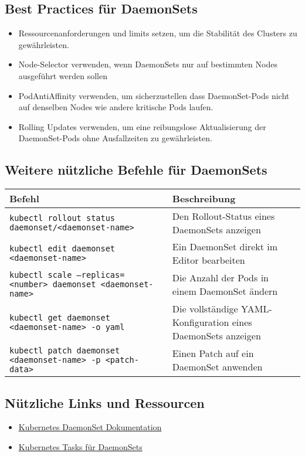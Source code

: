 \subsection{Best Practices für DaemonSets}
\begin{itemize}
    \item Ressourcenanforderungen und limits setzen, um die Stabilität des Clusters zu gewährleisten.
    \item Node-Selector verwenden, wenn DaemonSets nur auf bestimmten Nodes ausgeführt werden sollen
    \item PodAntiAffinity verwenden, um sicherzustellen dass DaemonSet-Pods nicht auf denselben Nodes wie andere kritische Pods laufen.
    \item Rolling Updates verwenden, um eine reibungslose Aktualisierung der DaemonSet-Pods ohne Ausfallzeiten zu gewährleisten.
\end{itemize}
\subsection{Weitere nützliche Befehle für DaemonSets}
\begin{tabular}{|p{}|p{}|}
\hline
\textbf{Befehl} & \textbf{Beschreibung} \\
\hline
\texttt{kubectl rollout status daemonset/<daemonset-name>} & Den Rollout-Status eines DaemonSets anzeigen \\
\texttt{kubectl edit daemonset <daemonset-name>} & Ein DaemonSet direkt im Editor bearbeiten \\
\texttt{kubectl scale --replicas=<number> daemonset <daemonset-name>} & Die Anzahl der Pods in einem DaemonSet ändern \\
\texttt{kubectl get daemonset <daemonset-name> -o yaml} & Die vollständige YAML-Konfiguration eines DaemonSets anzeigen \\
\texttt{kubectl patch daemonset <daemonset-name> -p <patch-data>} & Einen Patch auf ein DaemonSet anwenden \\
\hline
\end{tabular}

\subsection{Nützliche Links und Ressourcen}
\begin{itemize}
    \item \href{https://kubernetes.io/docs/concepts/workloads/controllers/daemonset/}{Kubernetes DaemonSet Dokumentation}
    \item \href{https://kubernetes.io/docs/tasks/manage-daemon/}{Kubernetes Tasks für DaemonSets}
\end{itemize}


